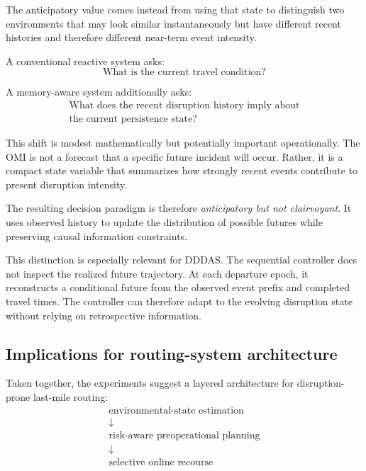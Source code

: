 \documentclass[preprint,12pt]{elsarticle}
\newcommand{\1}{\mathbf{1}}
\begin{document}
The anticipatory value comes instead from using that state to distinguish two
environments that may look similar instantaneously but have different recent
histories and therefore different near-term event intensity.

A conventional reactive system asks:
\[
\text{What is the current travel condition?}
\]

A memory-aware system additionally asks:
\[
\begin{gathered}
\text{What does the recent disruption history imply about}\\
\text{the current persistence state?}
\end{gathered}
\]

This shift is modest mathematically but potentially important operationally.
The OMI is not a forecast that a specific future incident will occur.
Rather, it is a compact state variable that summarizes how strongly recent
events contribute to present disruption intensity.

The resulting decision paradigm is therefore \emph{anticipatory but not
	clairvoyant}. It uses observed history to update the distribution of possible
futures while preserving causal information constraints.

This distinction is especially relevant for DDDAS.
The sequential controller does not inspect the realized future trajectory.
At each departure epoch, it reconstructs a conditional future from the observed
event prefix and completed travel times. The controller can therefore adapt to
the evolving disruption state without relying on retrospective information.

\subsection{Implications for routing-system architecture}
\label{subsec:architecture}

Taken together, the experiments suggest a layered architecture for
disruption-prone last-mile routing:
\begin{equation}
\boxed{\begin{gathered}
\text{environmental-state estimation}\\[-1pt]
\downarrow\\[-1pt]
\text{risk-aware preoperational planning}\\[-1pt]
\downarrow\\[-1pt]
\text{selective online recourse}
\end{gathered}}
\end{equation}
\end{document}
